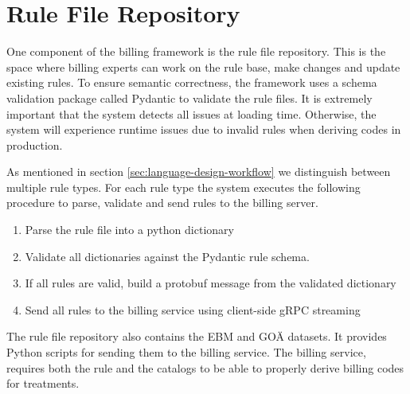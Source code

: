 \section{Rule File Repository}\label{sec:rule-file-repository}
One component of the billing framework is the rule file repository.
This is the space where billing experts can work on the rule base, make changes and update existing rules.
To ensure semantic correctness, the framework uses a schema validation package called Pydantic to validate the rule files.
It is extremely important that the system detects all issues at loading time.
Otherwise, the system will experience runtime issues due to invalid rules when deriving codes in production.

As mentioned in section \ref{sec:language-design-workflow} we distinguish between multiple rule types.
For each rule type the system executes the following procedure to parse, validate and send \RL rules to the billing server.
\begin{enumerate}
    \item Parse the rule file into a python dictionary
    \item Validate all dictionaries against the Pydantic rule schema.
    \item If all rules are valid, build a  protobuf message from the validated dictionary
    \item Send all rules to the billing service using client-side gRPC streaming
\end{enumerate}

The rule file repository also contains the EBM and GOÄ datasets.
It provides Python scripts for sending them to the billing service.
The billing service, requires both the rule and the catalogs to be able to properly derive billing codes for treatments.

